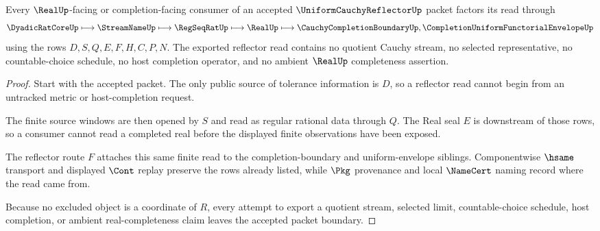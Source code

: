 \begin{theorem}
\label{thm:uniform-cauchy-reflector-nonescape}
Every $\RealUp$-facing or completion-facing consumer of an accepted $\UniformCauchyReflectorUp$ packet factors its read through
$$
\DyadicRatCoreUp \longmapsto \StreamNameUp \longmapsto \RegSeqRatUp \longmapsto \RealUp
\longmapsto \CauchyCompletionBoundaryUp,\CompletionUniformFunctorialEnvelopeUp
$$
using the rows $D,S,Q,E,F,H,C,P,N$. The exported reflector read contains no quotient Cauchy stream, no selected representative, no countable-choice schedule, no host completion operator, and no ambient $\RealUp$ completeness assertion.
\end{theorem}
\begin{proof}
Start with the accepted packet. The only public source of tolerance information is $D$, so a reflector read cannot begin from an untracked metric or host-completion request.

The finite source windows are then opened by $S$ and read as regular rational data through $Q$. The Real seal $E$ is downstream of those rows, so a consumer cannot read a completed real before the displayed finite observations have been exposed.

The reflector route $F$ attaches this same finite read to the completion-boundary and uniform-envelope siblings. Componentwise $\hsame$ transport and displayed $\Cont$ replay preserve the rows already listed, while $\Pkg$ provenance and local $\NameCert$ naming record where the read came from.

Because no excluded object is a coordinate of $R$, every attempt to export a quotient stream, selected limit, countable-choice schedule, host completion, or ambient real-completeness claim leaves the accepted packet boundary.
\end{proof}



